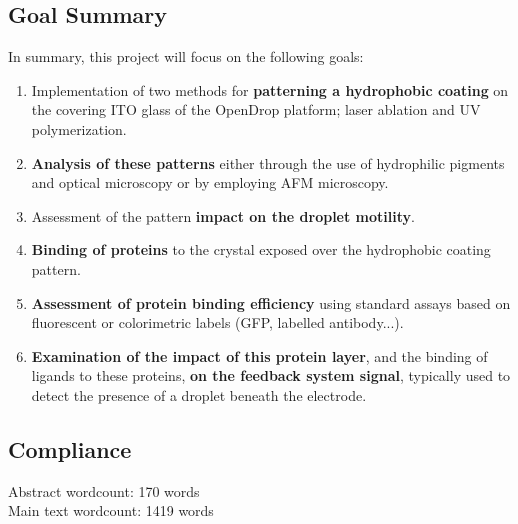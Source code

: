 \documentclass[8pt, twocolumn]{article}
\begin{document}
\subsection*{Goal Summary}

In summary, this project will focus on the following goals:

\begin{enumerate}
\item Implementation of two methods for \textbf{patterning a hydrophobic coating} on the covering ITO glass of the OpenDrop platform; laser ablation and UV polymerization.
\item \textbf{Analysis of these patterns} either through the use of hydrophilic pigments and optical microscopy or by employing AFM microscopy.
\item Assessment of the pattern \textbf{impact on the droplet motility}.
\item \textbf{Binding of proteins} to the crystal exposed over the hydrophobic coating pattern.
\item \textbf{Assessment of protein binding efficiency} using standard assays based on fluorescent or colorimetric labels (GFP, labelled antibody...).
\item \textbf{Examination of the impact of this protein layer}, and the binding of ligands to these proteins, \textbf{on the feedback system signal}, typically used to detect the presence of a droplet beneath the electrode.
\end{enumerate}



\clearpage
\onecolumn
\begin{footnotesize} %
  \section*{Compliance}
  Abstract wordcount: 170 words \\
  Main text wordcount: 1419 words
  
  
\end{footnotesize}
\end{document}
